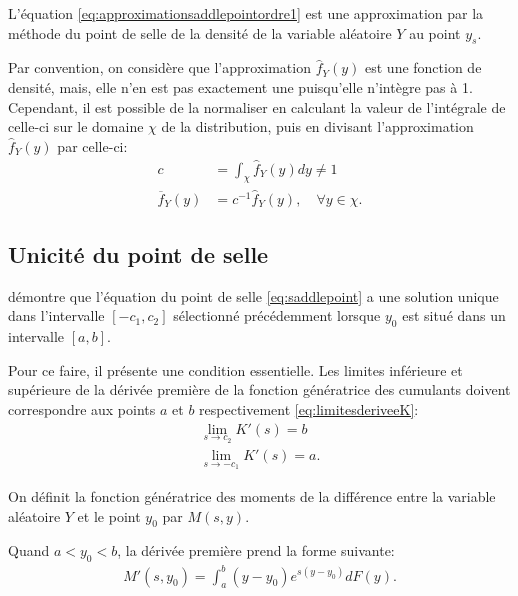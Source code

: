 L'équation \eqref{eq:approximationsaddlepointordre1} est une
approximation par la méthode du point de selle de la densité de la
variable aléatoire $Y$ au point $y_{s}$.

Par convention, on considère que l'approximation $\hat{f}_Y(y)$ est
une fonction de densité, mais, elle n'en est pas exactement une
puisqu'elle n'intègre pas à 1. Cependant, il est possible de la
normaliser en calculant la valeur de l'intégrale de celle-ci sur le
domaine $\chi$ de la distribution, puis en divisant l'approximation
$\hat{f}_Y(y)$ par celle-ci:
\begin{subequations}\label{eq:normalisationsaddle}
  \begin{align}
    c &= \int_{\chi} \hat{f}_Y(y) dy \neq 1 \label{eq:normalisationsaddle1}\\
    \overline{f}_Y(y) &= c^{-1} \hat{f}_Y(y),\quad \forall y \in
    \chi. \label{eq:normalisationsaddle2}
  \end{align}
\end{subequations}

\subsection{Unicité du point de selle}
\label{sec:unicite-du-point}

\cite{daniels1954saddlepoint} démontre que l'équation du point de
selle \eqref{eq:saddlepoint} a une solution unique dans l'intervalle
$\left[-c_1,c_2 \right]$ sélectionné précédemment lorsque $y_0$ est
situé dans un intervalle $\left[a,b\right]$.

Pour ce faire, il présente une condition essentielle. Les limites
inférieure et supérieure de la dérivée première de la fonction
génératrice des cumulants doivent correspondre aux points $a$ et $b$
respectivement \eqref{eq:limitesderiveeK}:
\begin{align}
  \label{eq:limitesderiveeK}
  \lim_{s\to c_2} K'(s) = b \\
  \lim_{s\to -c_1} K'(s) = a.
\end{align}

On définit la fonction génératrice des moments de la différence entre
la variable aléatoire $Y$ et le point $y_0$ par $M(s,y)$.

Quand $a < y_0 < b$, la dérivée première prend la forme suivante:
\begin{align}
  \label{eq:6}
  M'(s,y_0) = \int_{a}^{b} (y-y_0) e^{s(y-y_0)} dF(y).
\end{align}

